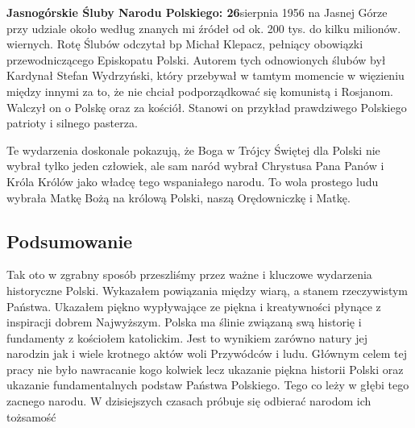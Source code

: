 \textbf{Jasnogórskie Śluby Narodu Polskiego: 26}sierpnia 1956 na Jasnej Górze przy
udziale około według znanych mi źródeł od ok. 200 tys. do kilku milionów.
wiernych. Rotę Ślubów odczytał bp Michał Klepacz, pełniący obowiązki
przewodniczącego Episkopatu Polski. Autorem tych odnowionych ślubów był
Kardynał Stefan Wydrzyński, który przebywał w tamtym momencie w więzieniu
między innymi za to, że nie chciał podporządkować się komunistą i Rosjanom.
Walczył on o Polskę oraz za kościół. Stanowi on przykład prawdziwego Polskiego
patrioty i silnego pasterza.

Te wydarzenia doskonale pokazują, że Boga w Trójcy Świętej dla Polski nie
wybrał tylko jeden człowiek, ale sam naród wybrał Chrystusa Pana Panów i Króla
Królów jako władcę tego wspaniałego narodu. To wola prostego ludu wybrała Matkę
Bożą na królową Polski, naszą Orędowniczkę i Matkę.

\subsection{Podsumowanie}

Tak oto w zgrabny sposób przeszliśmy przez ważne i kluczowe wydarzenia
historyczne Polski. Wykazałem powiązania między wiarą, a stanem rzeczywistym Państwa.
Ukazałem piękno wypływające ze piękna i kreatywności płynące z inspiracji dobrem
Najwyższym. Polska ma ślinie związaną swą historię i fundamenty z kościołem katolickim.
Jest to wynikiem zarówno natury jej narodzin jak i wiele krotnego aktów woli Przywódców i
ludu. Głównym celem tej pracy nie było nawracanie kogo kolwiek lecz ukazanie piękna
historii Polski oraz ukazanie fundamentalnych podstaw Państwa Polskiego. Tego co leży w
głębi tego zacnego narodu. W dzisiejszych czasach próbuje się odbierać narodom ich
tożsamość 
